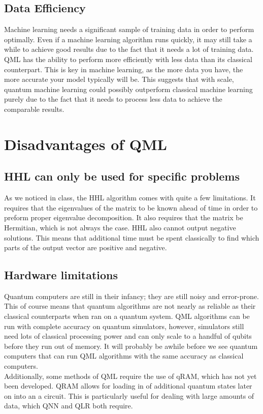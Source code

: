 \documentclass[12pt]{article}
\begin{document}
\subsection*{Data Efficiency}
Machine learning needs a significant sample of training data in order to perform optimally. Even if a machine learning algorithm runs quickly, it may still take a while to achieve good results due to the fact that it needs a lot of training data. QML has the ability to perform more efficiently with less data than its classical counterpart. This is key in machine learning, as the more data you have, the more accurate your model typically will be. This suggests that with scale, quantum machine learning could possibly outperform classical machine learning purely due to the fact that it needs to process less data to achieve the comparable results. \cite{Huang2021}

\section*{Disadvantages of QML}
\subsection*{HHL can only be used for specific problems}
As we noticed in class, the HHL algorithm comes with quite a few limitations. It requires that the eigenvalues of the matrix to be known ahead of time in order to preform proper eigenvalue decomposition. It also requires that the matrix be Hermitian, which is not always the case. HHL also cannot output negative solutions. This means that additional time must be spent classically to find which parts of the output vector are positive and negative.
\subsection*{Hardware limitations}
Quantum computers are still in their infancy; they are still noisy and error-prone. This of course means that quantum algorithms are not nearly as reliable as their classical counterparts when ran on a quantum system. QML algorithms can be run with complete accuracy on quantum simulators, however, simulators still need lots of classical processing power and can only scale to a handful of qubits before they run out of memory. It will probably be awhile before we see quantum computers that can run QML algorithms with the same accuracy as classical computers.\\
Additionally, some methods of QML require the use of qRAM, which has not yet been developed. QRAM allows for loading in of additional quantum states later on into an a circuit. This is particularly useful for dealing with large amounts of data, which QNN and QLR both require.
\end{document}
